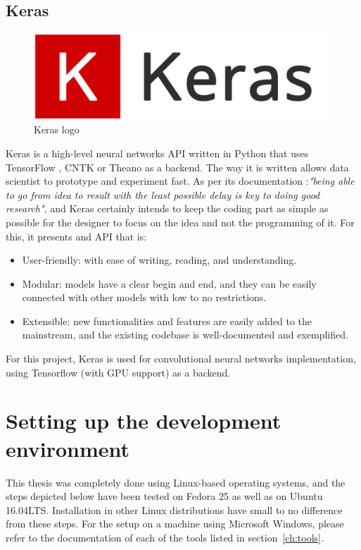 \subsection{Keras}
\begin{figure}[!ht]
    \centering
    \includegraphics[width=0.5\linewidth]{figures/keras_logo}
    \caption{Keras logo}
    \label{fig:keras_logo}
\end{figure}
Keras is a high-level neural networks API written in Python that uses TensorFlow \cite{TensorFlow}, CNTK \cite{CNTK} or Theano \cite{Theano} as a backend. The way it is written allows data scientist to prototype and experiment fast. As per its documentation \cite{KERAS}:\emph{"being able to go from idea to result with the least possible delay is key to doing good research"}, and Keras certainly intends to keep the coding part as simple as possible for the designer to focus on the idea and not the programming of it. For this, it presents and API that is:

\begin{itemize}
    \item User-friendly: with ease of writing, reading, and understanding.
    \item Modular: models have a clear begin and end, and they can be easily connected with other models with low to no restrictions.
    \item Extensible: new functionalities and features are easily added to the mainstream, and the existing codebase is well-documented and exemplified.
\end{itemize}

For this project, Keras is used for convolutional neural networks implementation, using Tensorflow (with GPU support) as a backend.

\section{Setting up the development environment}
This thesis was completely done using Linux-based operating systems, and the steps depicted below have been tested on Fedora 25 as well as on Ubuntu 16.04LTS. Installation in other Linux distributions have small to no difference from these steps. For the setup on a machine using Microsoft Windows\texttrademark, please refer to the documentation of each of the tools listed in section~\ref{ch:tools}.\\

